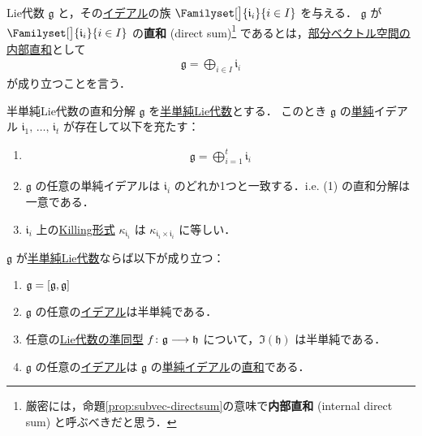 \documentclass[rep_main]{subfiles}
\begin{document}
Lie代数 $\mathfrak{g}$ と，その\hyperref[def:ideal-LieAlg]{イデアル}の族 $\Familyset[\big]{\mathfrak{i}_i}{i \in I}$ を与える．
$\mathfrak{g}$ が $\Familyset[\big]{\mathfrak{i}_i}{i \in I}$ の\textbf{直和} (direct sum)\footnote{厳密には，命題\ref{prop:subvec-directsum}の意味で\textbf{内部直和} (internal direct sum) と呼ぶべきだと思う．} 
であるとは，\hyperref[prop:subvec-directsum]{部分ベクトル空間の内部直和}として
\begin{align}
	\mathfrak{g} = \bigoplus_{i \in I} \mathfrak{i}_i
\end{align}
が成り立つことを言う．

\begin{mytheo}[label=thm:semisimple-decomp]{半単純Lie代数の直和分解}
	$\mathfrak{g}$ を\hyperref[def:semisimple-LieAlg]{半単純Lie代数}とする．
	このとき $\mathfrak{g}$ の\hyperref[def:simple-LieAlg]{単純}イデアル $\mathfrak{i}_1,\, \dots,\, \mathfrak{i}_t$ が存在して以下を充たす：
	\begin{enumerate}
		\item \begin{align}
			\mathfrak{g} = \bigoplus_{i = 1}^t \mathfrak{i}_i
		\end{align}
		\item $\mathfrak{g}$ の任意の単純イデアルは $\mathfrak{i}_i$ のどれか1つと一致する．i.e. (1) の直和分解は一意である．
		\item $\mathfrak{i}_i$ 上の\hyperref[def:Killing-form]{Killing形式} $\kappa_{\mathfrak{i}_i}$ は $\kappa_{\mathfrak{i}_i \times \mathfrak{i}_i}$ に等しい．
	\end{enumerate}
	
\end{mytheo}

\begin{mycol}[label=col:semisimple-decomp]{}
	$\mathfrak{g}$ が\hyperref[def:semisimple-LieAlg]{半単純Lie代数}ならば以下が成り立つ：
	\begin{enumerate}
		\item $\mathfrak{g} = \comm{\mathfrak{g}}{\mathfrak{g}}$
		\item $\mathfrak{g}$ の任意の\hyperref[def:ideal-LieAlg]{イデアル}は半単純である．
		\item 任意の\hyperref[def:hom-LieAlg]{Lie代数の準同型} $f \colon \mathfrak{g} \longrightarrow \mathfrak{h}$ について，$\Im (\mathfrak{h})$ は半単純である．
		\item $\mathfrak{g}$ の任意の\hyperref[def:ideal-LieAlg]{イデアル}は $\mathfrak{g}$ の\hyperref[def:simple-LieAlg]{単純イデアル}の\hyperref[prop:subvec-directsum]{直和}である．
	\end{enumerate}
	
\end{mycol}
\end{document}
